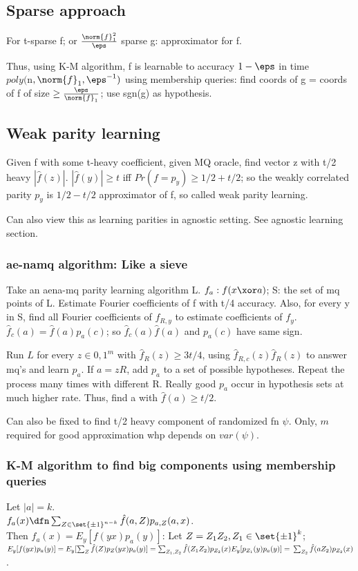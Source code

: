 \documentclass[oneside, article]{memoir}
\begin{document}
\subsection{Sparse approach}
For t-sparse f; or $\frac{\norm{f}_{1}^{2}}{\eps}$ sparse g: approximator for f.

Thus, using K-M algorithm, f is learnable to accuracy $1-\eps$ in time \\
$poly($n$, \norm{f}_{1}, \eps^{-1})$ using membership queries: find coords of g = coords of f of size $\geq \frac{\eps}{\norm{f}_{1}}$; use sgn(g) as hypothesis.

\subsection{Weak parity learning}
Given f with some t-heavy coefficient, given MQ oracle, find vector z with t/2 heavy $|\hat{f}(z)|$. $|\hat{f}(y)| \geq t$ iff $Pr(f = p_{y}) \geq 1/2 + t/2$; so the weakly correlated parity $p_{y}$ is $1/2 - t/2$ approximator of f, so called weak parity learning.

Can also view this as learning parities in agnostic setting. See agnostic learning section.

\subsubsection{ae-namq algorithm: Like a sieve}
Take an aena-mq parity learning algorithm L.  $f_a: f(x \xor a)$; S: the set of mq points of L. Estimate Fourier coefficients of f with t/4 accuracy. Also, for every y in S, find all Fourier coefficients of $f_{R,y}$ to estimate coefficients of $f_y$. $\hat{f}_c(a) = \hat{f}(a)p_a(c)$; so $\hat{f}_c(a)\hat{f}(a)$ and $p_a(c)$ have same sign.

Run $L$ for every $z \in {0, 1}^m$ with $\hat{f}_R(z) \geq 3t/4$, using $\hat{f}_{R,c}(z)\hat{f}_R(z)$ to answer mq's and learn $p_a$. If $a=zR$, add $p_a$ to a set of possible hypotheses. Repeat the process many times with different R. Really good $p_a$ occur in hypothesis sets at much higher rate. Thus, find a with $\hat{f}(a) \geq t/2$.

Can also be fixed to find t/2 heavy component of randomized fn $\psi$. Only, $m$ required for good approximation whp depends on $var(\psi)$.

\subsubsection{K-M algorithm to find big components using membership queries}
Let $|a| = k$. \\
$f_{a}(x) \dfn \sum_{Z \in \set{\pm 1}^{n-k}} \hat{f}(a,Z)p_{a,Z}(a,x)$.\\
Then $f_{a}(x) = E_{y}[f(yx)p_{a}(y)]$: Let $Z = Z_{1}Z_{2}, Z_{1} \in \set{\pm 1}^{k}$; $E_{y}[f(yx)p_{a}(y)] =\\
 E_{y}[\sum_{Z} \hat{f}(Z)p_{Z}(yx) p_{a}(y)] = \sum_{Z_{1}, Z_{2}} \hat{f}(Z_{1} Z_{2}) p_{Z_{2}}(x) E_{y}[p_{Z_{1}}(y)p_{a}(y)] =\\
 \sum_{Z_{2}} \hat{f}(a Z_{2}) p_{Z_{2}}(x)$.
\end{document}
